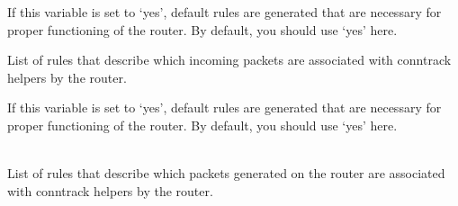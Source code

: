 \begin{description}

If this variable is set to `yes', default rules are generated that
are necessary for proper functioning of the router. By default, you should use `yes' here.

List of rules that describe which incoming packets are associated with
conntrack helpers by the router.

If this variable is set to `yes', default rules are generated that
are necessary for proper functioning of the router. By default, you should use `yes' here.

\mbox{}\\
List of rules that describe which packets generated on the router are associated with
conntrack helpers by the router.

\end{description}
